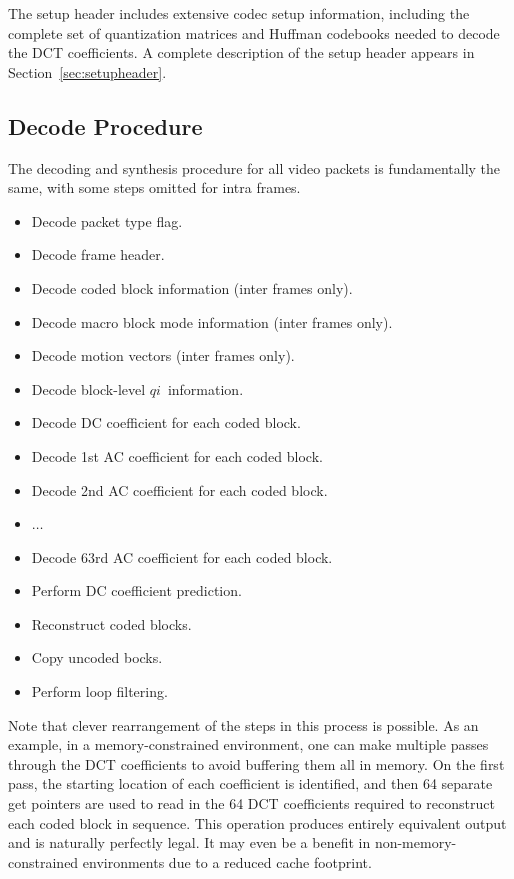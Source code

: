 \documentclass[11pt,letterpaper]{book}
\newcommand{\idx}[1]{{\ensuremath{\mathit{#1}}}}
\newcommand{\qi}{\idx{qi}}
\numberwithin{equation}{chapter}
\numberwithin{figure}{chapter}
\numberwithin{table}{chapter}
\begin{document}
The setup header includes extensive codec setup information, including the
 complete set of quantization matrices and Huffman codebooks needed to decode
 the DCT coefficients.
A complete description of the setup header appears in
 Section~\ref{sec:setupheader}.

\subsection{Decode Procedure}

The decoding and synthesis procedure for all video packets is fundamentally the
 same, with some steps omitted for intra frames.
\begin{itemize}
\item
Decode packet type flag.
\item
Decode frame header.
\item
Decode coded block information (inter frames only).
\item
Decode macro block mode information (inter frames only).
\item
Decode motion vectors (inter frames only).
\item
Decode block-level \qi\ information.
\item
Decode DC coefficient for each coded block.
\item
Decode 1st AC coefficient for each coded block.
\item
Decode 2nd AC coefficient for each coded block.
\item
$\ldots$
\item
Decode 63rd AC coefficient for each coded block.
\item Perform DC coefficient prediction.
\item Reconstruct coded blocks.
\item Copy uncoded bocks.
\item Perform loop filtering.
\end{itemize}

Note that clever rearrangement of the steps in this process is possible.
As an example, in a memory-constrained environment, one can make multiple
 passes through the DCT coefficients to avoid buffering them all in memory.
On the first pass, the starting location of each coefficient is identified, and
 then 64 separate get pointers are used to read in the 64 DCT coefficients
 required to reconstruct each coded block in sequence.
This operation produces entirely equivalent output and is naturally perfectly
 legal.
It may even be a benefit in non-memory-constrained environments due to a
 reduced cache footprint.
\end{document}
